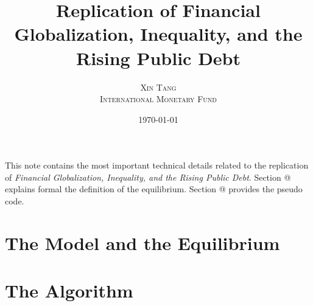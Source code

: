 \documentclass[twoside,11pt,leqno]{article}
\title{\vspace{-1cm}\Large{{\textsf{Replication of Financial Globalization, Inequality, and the Rising Public Debt}}}}
\author{\normalsize\textsc{Xin Tang} \\ \normalsize\textsc{International Monetary Fund}}
\date{\normalsize\today}
\makeatletter
\newcommand*{\rom}[1]{\expandafter\@slowromancap\romannumeral #1@}
\makeatother
\begin{document}
\maketitle

This note contains the most important technical details related to the replication of \textit{Financial Globalization, Inequality, and the Rising Public Debt}. Section \rom{1} explains formal the definition of the equilibrium. Section \rom{2} provides the pseudo code.

\section{The Model and the Equilibrium}


\section{The Algorithm}




\end{document}

